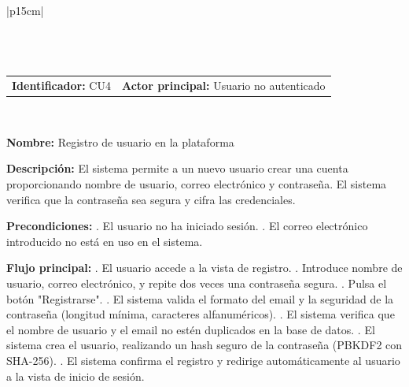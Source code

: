 \vspace{0.5cm}

\begingroup
{}
\setlength{\arrayrulewidth}{1pt}
\begin{longtable}{|p{15cm}|}
  \hline
   \\
  \hline
  \endfirsthead
   \\
  \hline
   \\
  \hline
  \endhead
  \hline {} \\ \hline
  \endfoot
  \hline
  \caption{Caso de uso 4 — Registro de usuario en la plataforma.}
  \label{TB:CU4_REGISTRO}
  \endlastfoot

  \begin{tabularx}{\linewidth}{@{}X X@{}}
    \textbf{Identificador:} CU4 & \textbf{Actor principal:} Usuario no autenticado
  \end{tabularx} \\ \hline

  \textbf{Nombre:} Registro de usuario en la plataforma \\ \hline

  \textbf{Descripción:} \newline 
  El sistema permite a un nuevo usuario crear una cuenta proporcionando nombre de usuario, correo electrónico y contraseña. El sistema verifica que la contraseña sea segura y cifra las credenciales. \\ \hline

  \textbf{Precondiciones:} . El usuario no ha iniciado sesión. . El correo electrónico introducido no está en uso en el sistema. \\ \hline

  \textbf{Flujo principal:} . El usuario accede a la vista de registro. . Introduce nombre de usuario, correo electrónico, y repite dos veces una contraseña segura. . Pulsa el botón "Registrarse". . El sistema valida el formato del email y la seguridad de la contraseña (longitud mínima, caracteres alfanuméricos). . El sistema verifica que el nombre de usuario y el email no estén duplicados en la base de datos. . El sistema crea el usuario, realizando un hash seguro de la contraseña (PBKDF2 con SHA-256). . El sistema confirma el registro y redirige automáticamente al usuario a la vista de inicio de sesión. \\ \hline


\end{longtable}
